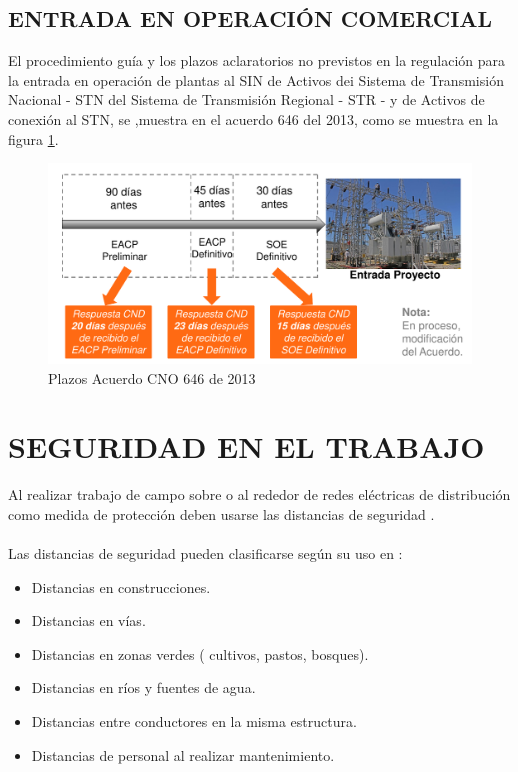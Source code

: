 \documentclass[a5paper]{book}%
\begin{document}
    \section{ENTRADA EN OPERACIÓN COMERCIAL}

    El procedimiento guía y los plazos aclaratorios no previstos en la regulación para la entrada en operación de plantas al SIN de Activos dei Sistema de Transmisión Nacional - STN del Sistema de Transmisión Regional - STR - y de Activos de conexión al STN,  se ,muestra en el acuerdo 646 del 2013, como se muestra en la figura \ref{fig:plazo646}.

    \begin{figure}[H]
      \caption{Plazos Acuerdo CNO 646 de 2013}
      \label{fig:plazo646}
      \includegraphics[width=\linewidth]{plazo_cno}
      \end{figure}


\chapter{SEGURIDAD EN EL TRABAJO}
Al realizar trabajo de campo sobre o al rededor de redes eléctricas de distribución como medida de protección deben usarse las distancias de seguridad \cite{RETIE2013}.\\\\

Las distancias de seguridad pueden clasificarse según su uso en :

\begin{itemize}
\item Distancias en construcciones.
\item Distancias en vías.
\item Distancias en zonas verdes ( cultivos, pastos, bosques).
\item Distancias en ríos y fuentes de agua.
\item Distancias entre conductores en la misma estructura.
\item Distancias de personal al realizar mantenimiento.
\end{itemize}
\end{document}
